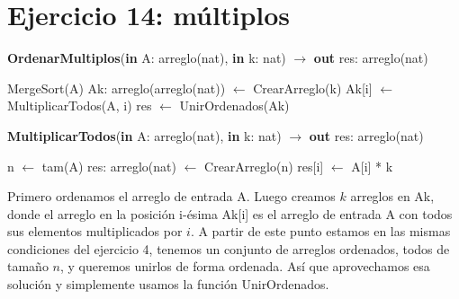 \section{Ejercicio 14: múltiplos}

\begin{algorithm}[H]
\caption{
    \textbf{OrdenarMultiplos}(\textbf{in} A: arreglo(nat), \textbf{in} k: nat) $\to$ \textbf{out} res: arreglo(nat)
}
\begin{algorithmic}[1]
    \State MergeSort(A) 
    \State Ak: arreglo(arreglo(nat)) $\gets$ CrearArreglo(k) 
     
        \State Ak[i] $\gets$ MultiplicarTodos(A, i) 
    \EndFor
    \State res $\gets$ UnirOrdenados(Ak) 
\end{algorithmic}
\end{algorithm}

\begin{algorithm}[H]
\caption{
    \textbf{MultiplicarTodos}(\textbf{in} A: arreglo(nat), \textbf{in} k: nat) $\to$ \textbf{out} res: arreglo(nat)
}
\begin{algorithmic}[1]
    \State n $\gets$ tam(A)
    \State res: arreglo(nat) $\gets$ CrearArreglo(n) 
     
        \State res[i] $\gets$ A[i] * k
    \EndFor
\end{algorithmic}
\end{algorithm}

Primero ordenamos el arreglo de entrada A. Luego creamos $k$ arreglos en Ak, donde el arreglo en la posición i-ésima Ak[i] es el arreglo de entrada A con todos sus elementos multiplicados por $i$. A partir de este punto estamos en las mismas condiciones del ejercicio 4, tenemos un conjunto de arreglos ordenados, todos de tamaño $n$, y queremos unirlos de forma ordenada. Así que aprovechamos esa solución y simplemente usamos la función UnirOrdenados.
